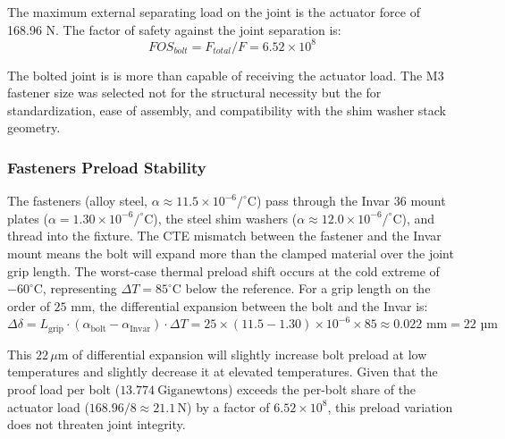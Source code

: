 \documentclass[12pt, letterpaper]{report}%
\newcounter{mycounter}           %
\newcounter{sub}[mycounter]      %
\begin{document}
        The maximum external separating load on the joint is the actuator force of 168.96 N. The factor of safety against the joint separation is:
        \[ FOS_{bolt} = F_{total} / F = 6.52 \times 10^8 \]
        
        The bolted joint is is more than capable of receiving the actuator load. The M3 fastener size was selected not for the structural necessity but the for standardization, ease of assembly, and compatibility with the shim washer stack geometry.

        \subsubsection{Fasteners Preload Stability}
        The fasteners (alloy steel, \( \alpha \approx 11.5 \times 10^{-6} /^\circ\text{C} \)) pass through the Invar 36 mount plates (\( \alpha = 1.30 \times 10^{-6} /^\circ\text{C} \)), 
        the steel shim washers (\( \alpha \approx 12.0 \times 10^{-6} /^\circ\text{C} \)), and thread into the fixture. The CTE mismatch between the fastener and the Invar mount means the bolt will expand more than the clamped material over the joint grip length. 
        The worst-case thermal preload shift occurs at the cold extreme of \( -60^\circ\text{C} \), representing \( \Delta T = 85^\circ\text{C} \) below the reference. For a grip length on the order of \( 25 \text{ mm} \), the differential expansion between the bolt and the Invar is:
        \(\Delta\delta = L_{\text{grip}} \cdot (\alpha_{\text{bolt}} - \alpha_{\text{Invar}}) \cdot \Delta T = 25 \times (11.5 - 1.30) \times 10^{-6} \times 85 \approx 0.022 \text{ mm} = 22 \text{ µm}\)

        This $22 \, \mu\text{m}$ of differential expansion will slightly increase bolt preload at low temperatures and slightly decrease it at elevated temperatures. 
        Given that the proof load per bolt ($13.774 \ \text{Giganewtons}$) exceeds the per-bolt share of the actuator load ($168.96 / 8 \approx 21.1 \, \text{N}$) by a factor of $6.52 \times 10^8$, this preload variation does not threaten joint integrity. 




        
\end{document}
